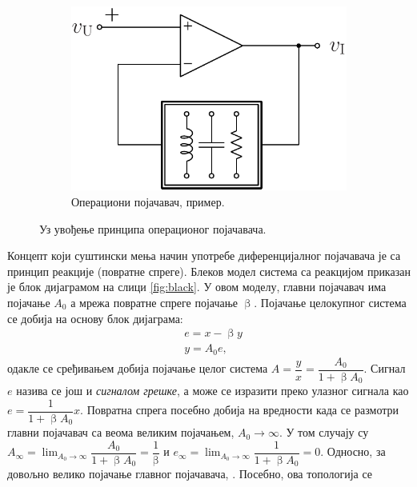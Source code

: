 \begin{figure}[b!]
    ~ %
    \begin{subfigure}[c]{0.32\textwidth}
    \centering
        \includegraphics[scale=0.5]
        {fig/black-model-op-conc.pdf}
        \caption{Операциони појачавач, пример.}
        \label{fig:black3}
    \end{subfigure}
    \caption{Уз увођење принципа операционог појачавача.}
\end{figure}
%
Концепт који суштински мења начин употребе диференцијалног појачавача 
је са принцип реакције (повратне спреге). Блеков модел система са реакцијом 
приказан је 
блок дијаграмом
на слици \ref{fig:black}. У овом моделу, главни 
појачавач има појачање $A_0$ а мрежа повратне спреге појачање 
$\upbeta$. Појачање целокупног система се добија на основу 
блок дијаграма:
\begin{eqnarray}
	&e = x - \upbeta y \\
	&y = A_0 e, 
\end{eqnarray}
одакле се сређивањем добија појачање целог система
$A = \dfrac{y}{x} = \dfrac{A_0}{1 + \upbeta A_0}$.   
%
Сигнал $e$ назива се још и \textit{сигналом грешке}, а може се 
изразити преко улазног сигнала као $e = \dfrac{1}{1 + \upbeta A_0}x$.
Повратна спрега посебно добија на вредности када се размотри 
главни појачавач са веома великим појачањем, $A_{0} \to \infty$. У том случају су $A_{\infty} = \lim_{A_{0} \to \infty} 
\dfrac{A_0}{1 + \upbeta A_0} = \dfrac{1}{\upbeta}$ и 
$e_{\infty} = \lim_{A_{0} \to \infty} 
\dfrac{1}{1 + \upbeta A_0} = 0$. Односно, за довољно велико појачање 
главног појачавача, . Посебно, ова топологија се 
